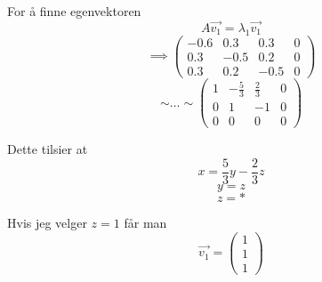 For å finne egenvektoren
$$A\vec{v_1} = \lambda_1 \vec{v_1}$$
$$\implies \begin{pmatrix}
           -0.6 & 0.3 & 0.3 & 0 \\
           0.3 & -0.5 & 0.2 & 0 \\
           0.3 & 0.2 & -0.5 & 0
           \end{pmatrix}$$
$$\sim ... \sim \begin{pmatrix}
                1 & -\frac{5}{3} & \frac{2}{3} & 0 \\
                0 & 1 & -1 & 0 \\
                0 & 0 & 0 & 0
                \end{pmatrix}$$

Dette tilsier at
$$x = \frac{5}{3}y - \frac{2}{3}z$$
$$y = z$$
$$z = *$$

Hvis jeg velger $z = 1$ får man
$$\vec{v_1} = \begin{pmatrix}
              1 \\ 1 \\ 1
              \end{pmatrix}$$
